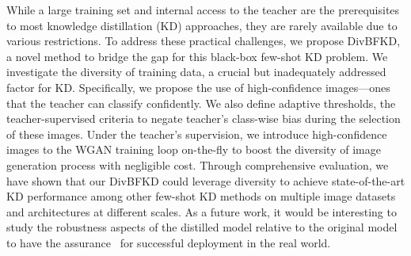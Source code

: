 While a large training set and internal access to the teacher are the prerequisites to most knowledge distillation (KD) approaches, they are rarely available due to various restrictions.
To address these practical challenges, we propose DivBFKD, a novel method to bridge the gap for this black-box few-shot KD problem.
We investigate the diversity of training data, a crucial but inadequately addressed factor for KD.
Specifically, we propose the use of high-confidence images---ones that the teacher can classify confidently.
We also define adaptive thresholds, the teacher-supervised criteria to negate teacher's class-wise bias during the selection of these images.
Under the teacher's supervision, we introduce high-confidence images to the WGAN training loop on-the-fly to boost the diversity of image generation process with negligible cost.
Through comprehensive evaluation, we have shown that our DivBFKD could leverage diversity to achieve state-of-the-art KD performance among other few-shot KD methods on multiple image datasets and architectures at different scales.
As a future work, it would be interesting to study the robustness aspects of the distilled model relative to the original model to have the assurance~\cite{gopakumar2018algorithmic} for successful deployment in the real world.